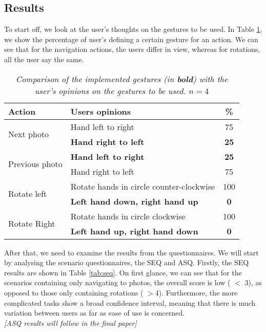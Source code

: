 \documentclass[11pt,a4paper]{article}
\begin{document}
\subsection{Results}
To start off, we look at the user's thoughts on the gestures to be used. In Table \ref{tab:compGes}, we show the percentage of user's defining a certain gesture for an action. We can see that for the navigation actions, the users differ in view, whereas for rotations, all the user say the same.
\renewcommand{\arraystretch}{1.5}
\begin{table}[h!]
\begin{center}
\begin{tabular}{l || l | c}
\textbf{Action} & \textbf{ Users opinions} & \% \\
\hline
\multirow{2}{*}{Next photo} & Hand left to right & 75\\
 & \textbf{Hand right to left }& \textbf{25} \\
\hline
\multirow{2}{*}{Previous photo} & \textbf{Hand left to right} & \textbf{25}\\
& Hand right to left & 75\\
\hline
\multirow{2}{*}{Rotate left} & Rotate hands in circle counter-clockwise & 100 \\
& \textbf{Left hand down, right hand up} & \textbf{0} \\
\hline
\multirow{2}{*}{Rotate Right} & Rotate hands in circle clockwise & 100 \\
& \textbf{Left hand up, right hand down} & \textbf{0}
\end{tabular}
\end{center}
\caption{\textit{Comparison of the implemented gestures (in \textbf{bold}) with the user's opinions on the gestures to be used. $ n = 4$}}
\label{tab:compGes}
\end{table}


After that, we need to examine the results from the questionnaires. We will start by analysing the scenario questionnaires, the SEQ and ASQ.
Firstly, the SEQ results are shown in Table \ref{tab:seq}. On first glance, we can see that for the scenarios containing only navigating to photos, the overall score is low ( $<$ 3), as opposed to those only containing rotations ( $>$4). Furthermore, the more complicated tasks show a broad confidence interval, meaning that there is much variation between users as far as ease of use is concerned. \\

\textit{[ASQ results will follow in the final paper]\\}
\end{document}
